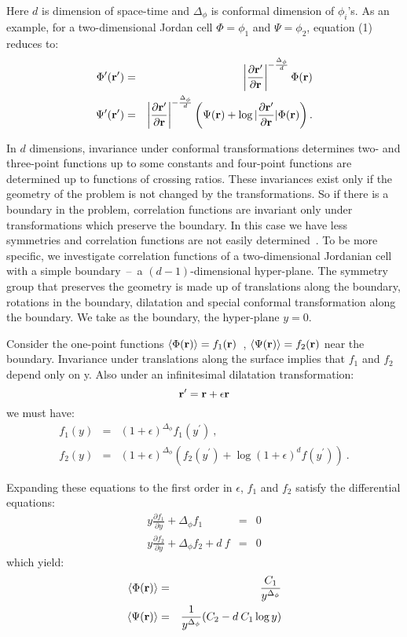 Here $d$ is dimension of space-time and $\Delta_{\phi}$ is conformal
dimension of $\phi_{i}$'s. As an example, for a two-dimensional Jordan
cell  $\Phi=\phi_{1}$ and $\Psi=\phi_{2}$, equation (1) reduces to:
\begin{eqnarray}
\Phi^{\prime}({\bf{r^{\prime}}})&=&
\left|\frac {\partial{{\bf{r^{\prime}}}}}
{\partial{\bf{r}}}\right|^{-\frac{\Delta_{\phi}}{d}}\Phi({\bf{r}})\nonumber\\
\Psi^{\prime}({\bf{r^{\prime}}})&=&
\left|\frac {\partial{{\bf{r^{\prime}}}}}{\partial{\bf{r}}}
\right|^{-\frac{\Delta_{\phi}}{d}}\left(\Psi({\bf{r}})
+\log|\frac {\partial{\bf{r^{\prime}}}}{\partial{\bf{r}}}
|\Phi(\bf{r})\right).
\end{eqnarray}

In $d$ dimensions, invariance under conformal transformations determines
two- and three-point functions up to some constants and four-point 
functions are determined up to functions of crossing ratios. These invariances exist only
if the geometry of the problem is not changed by the transformations. So if there
is a boundary in the problem, correlation functions are invariant only under 
transformations which preserve the boundary. In this case we have less
symmetries and correlation functions are not easily determined~.
To be more specific, we investigate correlation functions of a two-dimensional
Jordanian cell with a simple boundary~--~a $(d-1)$-dimensional hyper-plane.
The symmetry group that preserves the geometry is made up of translations
along the boundary, rotations in the boundary, dilatation and special
conformal transformation along the boundary. We take as the boundary,
the hyper-plane $y=0$.

Consider the one-point functions $\left<\Phi({\bf{r}})\right>=f_{1}(\bf{r})$~,
$\left<\Psi(\bf{r})\right>=f_{2}(\bf{r})$ near the boundary. Invariance under translations
along the surface implies that $f_{1}$ and $f_{2}$ depend only on y. Also under an
infinitesimal dilatation transformation:
\begin{equation}
\bf{r^{\prime}}=\bf{r}+\epsilon\bf{r}
\end{equation}
we must have:
\begin{eqnarray}
f_{1}(y)&=&(1+\epsilon)^{\Delta_{\phi}}f_{1}(y^{\prime})~,\nonumber\\
f_{2}(y)&=&(1+\epsilon)^{\Delta_{\phi}}\left(f_{2}(y^{\prime})
+\log(1+\epsilon)^{d}f(y^{\prime})\right)~.
\end{eqnarray}

Expanding these equations to the first order in $\epsilon$, $f_{1}$ and $f_{2}$
satisfy the differential equations: 
\begin{eqnarray}
y\frac {\partial{f_{1}}}{\partial{y}}+\Delta_{\phi}f_{1}&=&0\nonumber\\
y\frac {\partial{f_{2}}}{\partial{y}}+\Delta_{\phi}f_{2}+d\:f&=&0
\end{eqnarray}
which yield:
\begin{eqnarray}
\left<\Phi(\bf{r})\right>&=&\frac {C_{1}}{y^{\Delta_\phi}} \nonumber\\
\left<\Psi(\bf{r})\right>&=&\frac {1}{y^{\Delta_\phi}}(C_{2}-d\:C_{1}\log{y}) 
\end{eqnarray}


